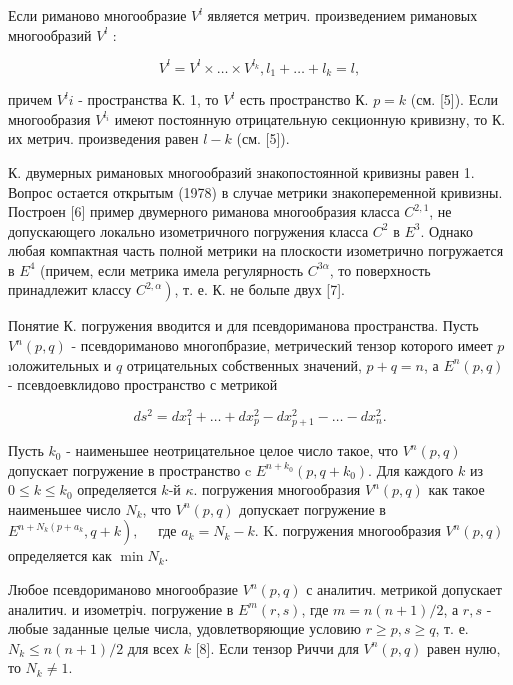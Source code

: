 \documentclass[10pt]{article}
\begin{document}
Если риманово многообразие $V^{l}$ является метрич. произведением римановых многообразий $V^{l}$ :



\[

V^{l}=V^{l} \times \ldots \times V^{l_{k}}, l_{1}+\ldots+l_{k}=l,

\]



причем $V^{l} i$ - пространства К. 1, то $V^{l}$ есть пространство К. $p=k$ (см. [5]). Если многообразия $V^{l_{i}}$ имеют постоянную отрицательную секционную кривизну, то К. их метрич. произведения равен $l-k$ (см. [5]).



К. двумерных римановых многообразий знакопостоянной кривизны равен 1. Вопрос остается открытым (1978) в случае метрики знакопеременной кривизны. Построен [6] пример двумерного риманова многообразия класса $C^{2,1}$, не допускающего локально изометричного погружения класса $C^{2}$ в $E^{3}$. Однако любая компактная часть полной метрики на плоскости изометрично погружается в $E^{4}$ (причем, если метрика имела регулярность $C^{3 \alpha}$, то поверхность принадлежит классу $\left.C^{2, \alpha}\right)$, т. е. К. не больпе двух [7].



Понятие К. погружения вводится и для псевдориманова пространства. Пусть $V^{n}(p, q)$ - псевдориманово многопбразие, метрический тензор которого имеет $p$ ıоложительных и $q$ отрицательных собственных значений, $p+q=n$, а $E^{n}(p, q)$ - псевдоевклидово пространство с метрикой



\[

d s^{2}=d x_{1}^{2}+\ldots+d x_{p}^{2}-d x_{p+1}^{2}-\ldots-d x_{n}^{2} .

\]



Пусть $k_{0}$ - наименьшее неотрицательное целое число такое, что $V^{n}(p, q)$ допускает погружение в пространство c $E^{n+k_{0}}\left(p, q+k_{0}\right)$. Для каждого $k$ из $0 \leqslant k \leqslant k_{0}$ определяется $k$-й $\kappa$. погружения многообразия $V^{n}(p, q)$ как такое наименьшее число $N_{k}$, что $V^{n}(p, q)$ допускает погружение в $\left.E^{n+N_{k}\left(p+a_{k}\right.}, q+k\right), \quad$ где $a_{k}=N_{k}-k$. K. погружения многообразия $V^{n}(p, q)$ определяется как $\min N_{k}$.



Любое псевдориманово многообразие $V^{n}(p, q)$ с аналитич. метрикой допускает аналитич. и изометріч. погружение в $E^{m}(r, s)$, где $m=n(n+1) / 2$, а $r, s$ - любые заданные целые числа, удовлетворяющие условию $r \geqslant p, s \geqslant q$, т. е. $N_{k} \leqslant n(n+1) / 2$ для всех $k$ [8]. Если тензор Риччи для $V^{n}(p, q)$ равен нулю, то $N_{k} \neq 1$.
\end{document}
